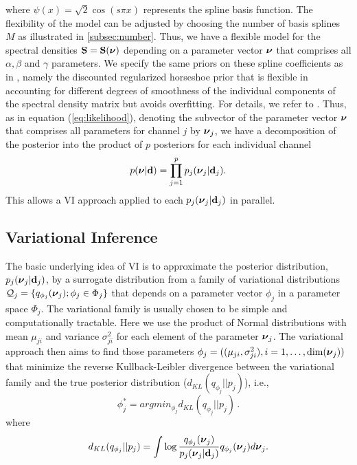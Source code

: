 \documentclass[%
 reprint,
 amsmath,amssymb,
 aps,
]{revtex4-2}
\begin{document}
where $\psi(x) = \sqrt{2} \cos(s\pi x)$ represents the spline basis function. The flexibility of the model can be adjusted by choosing the number of basis splines $M$ as illustrated in \ref{subsec:number}.
Thus, we have a flexible model for the spectral densities ${\bf S}={\bf S}(\mbox{\boldmath $\nu$})$ depending on a parameter vector $\mbox{\boldmath $\nu$}$  that comprises all $\alpha, \beta$ and $\gamma$ parameters. We specify the same priors on these spline coefficients as in \cite{Hu2023}, namely the discounted 
regularized horseshoe  prior \cite{PiironenJuho2017Siar} that is flexible in accounting for different degrees of smoothness of the individual components of the spectral density matrix but avoids overfitting. For details, we refer to \cite{Hu2023,PiironenJuho2017Siar}.
Thus, as in equation  (\ref{eq:likelihood}), denoting the subvector of the parameter vector $\mbox{\boldmath $\nu$}$ that comprises all parameters for channel $j$ by $\mbox{\boldmath $\nu$}_j$, we have a decomposition of the posterior into the product of $p$ posteriors for each individual channel
\begin{align}
p(\mbox{\boldmath $\nu$}|{\bf d} )= \prod_{j=1}^p p_j(\mbox{\boldmath $\nu$}_j|{\bf d}_j).
\end{align}
This allows a VI approach applied to each $p_j(\mbox{\boldmath $\nu$}_j|{\bf d}_j)$ in parallel.




\subsection{Variational Inference}

The basic underlying idea of VI \citep{Jordan1999,Wainwright2008} is to approximate the posterior distribution, $p_j(\mbox{\boldmath $\nu$}_j|{\bf d}_j)$, by a surrogate distribution from a family of variational distributions ${\cal Q}_j=\{ q_{\phi_j}(\mbox{\boldmath $\nu$}_j); \phi_j \in \Phi_j \}$ that depends on a parameter vector $\phi_j$ in a parameter space $\Phi_j$. The variational family is usually chosen to be simple and computationally tractable.
Here we use the product of Normal distributions with mean $\mu_{ji}$ and variance $\sigma^2_{ji}$ for each element of the parameter $\mbox{\boldmath $\nu$}_j$. The variational approach then aims to find those parameters 
$\phi_j=((\mu_{ji},\sigma^2_{ji}), i=1,\ldots,\mbox{dim}(\mbox{\boldmath $\nu$}_j))$ that minimize the reverse Kullback-Leibler divergence between the variational family and the true posterior distribution ($d_{KL}(q_{\phi_j}||p_j)$), i.e.,
\begin{equation}\label{eq:phi_min}
    \phi_j^*=argmin_{\phi_j} d_{KL}(q_{\phi_j}||p_j)  \,. 
\end{equation}
where 
\[ d_{KL}(q_{\phi_j}||p_j)= \int \log\frac{q_{\phi_j}(\mbox{\boldmath $\nu$}_j)}{p_j(\mbox{\boldmath $\nu$}_j|{\bf d}_j)}q_{\phi_j}(\mbox{\boldmath $\nu$}_j) d\mbox{\boldmath $\nu$}_j.\]
\end{document}
